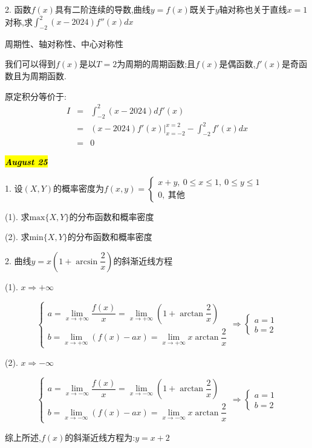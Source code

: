 2. 函数$f(x)$具有二阶连续的导数,曲线$y=f(x)$既关于$y$轴对称也关于直线$x=1$对称,求$\int_{-2}^{2}(x-2024)f''(x)dx$
\begin{solution}

	周期性、轴对称性、中心对称性
	
	我们可以得到$f(x)$是以$T=2$为周期的周期函数;且$f(x)$是偶函数,$f'(x)$是奇函数且为周期函数.
	
	原定积分等价于:  
	\begin{eqnarray*}
		I&=&\int_{-2}^{2}(x-2024)df'(x)\\
		&=&(x-2024)f'(x)|_{x=-2}^{x=2}-\int_{-2}^{2}f'(x)dx\\
		&=&0
	\end{eqnarray*}
\end{solution}

\hl{\textbf{\textit{August 25}}}

1. 设$(X,Y)$的概率密度为$f(x,y)=\left\lbrace
\begin{array}{l}
	x+y,\ 0\leq x\leq 1,\ 0\leq y\leq 1\\
	0,\ \text{其他}
\end{array}
\right. $

(1). 求$\text{max}\{X,Y\}$的分布函数和概率密度

(2). 求$\text{min}\{X,Y\}$的分布函数和概率密度
\begin{solution}
	
\end{solution}

2. 曲线$y=x(1+\arcsin \dfrac{2}{x})$的斜渐近线方程
\begin{solution}

	(1). $x\Rightarrow +\infty$
	
	$$\left\lbrace
	\begin{array}{l}
		a=\lim\limits_{x\rightarrow+\infty}\dfrac{f(x)}{x}=\lim\limits_{x\rightarrow+\infty}(1+\arctan\dfrac{2}{x})\\
		b=\lim\limits_{x\rightarrow+\infty}(f(x)-ax)=\lim\limits_{x\rightarrow+\infty}x\arctan\dfrac{2}{x}
	\end{array}
	\right. \Rightarrow \left\lbrace
	\begin{array}{l}
		a=1\\
		b=2
	\end{array}
	\right. $$
	
	(2). $x\Rightarrow -\infty$
	
	$$\left\lbrace
	\begin{array}{l}
		a=\lim\limits_{x\rightarrow-\infty}\dfrac{f(x)}{x}=\lim\limits_{x\rightarrow -\infty}(1+\arctan\dfrac{2}{x})\\
		b=\lim\limits_{x\rightarrow-\infty}(f(x)-ax)=\lim\limits_{x\rightarrow-\infty}x\arctan\dfrac{2}{x}
	\end{array}
	\right. \Rightarrow \left\lbrace
	\begin{array}{l}
		a=1\\
		b=2
	\end{array}
	\right. $$
	
	综上所述,$f(x)$的斜渐近线方程为:$y=x+2$
\end{solution}

